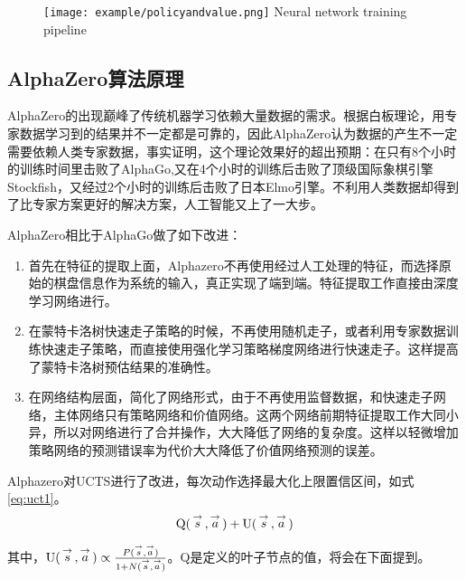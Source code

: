 \begin{figure}[htbp]
	\centering
	\texttt{[image: example/policyandvalue.png]}
	{Neural network training pipeline}
	\label{fig:policyandvalue}
\end{figure}

\subsection{AlphaZero算法原理}

AlphaZero的出现巅峰了传统机器学习依赖大量数据的需求。根据白板理论，用专家数据学习到的结果并不一定都是可靠的，因此AlphaZero认为数据的产生不一定需要依赖人类专家数据，事实证明，这个理论效果好的超出预期：在只有8个小时的训练时间里击败了AlphaGo,又在4个小时的训练后击败了顶级国际象棋引擎Stockfish，又经过2个小时的训练后击败了日本Elmo引擎。不利用人类数据却得到了比专家方案更好的解决方案，人工智能又上了一大步。

AlphaZero相比于AlphaGo做了如下改进：
\begin{enumerate}
	\item 首先在特征的提取上面，Alphazero不再使用经过人工处理的特征，而选择原始的棋盘信息作为系统的输入，真正实现了端到端。特征提取工作直接由深度学习网络进行。
	\item 在蒙特卡洛树快速走子策略的时候，不再使用随机走子，或者利用专家数据训练快速走子策略，而直接使用强化学习策略梯度网络进行快速走子。这样提高了蒙特卡洛树预估结果的准确性。
	\item 在网络结构层面，简化了网络形式，由于不再使用监督数据，和快速走子网络，主体网络只有策略网络和价值网络。这两个网络前期特征提取工作大同小异，所以对网络进行了合并操作，大大降低了网络的复杂度。这样以轻微增加策略网络的预测错误率为代价大大降低了价值网络预测的误差。
\end{enumerate}

Alphazero对UCTS进行了改进，每次动作选择最大化上限置信区间，如式\ref{eq:uct1}。
\begin{equation}
\label{eq:uct1}
{\rm{Q(}}\mathop s\limits^ \to  {\rm{,}}\mathop a\limits^ \to  {\rm{) + U(}}\mathop s\limits^ \to  {\rm{,}}\mathop a\limits^ \to  {\rm{)}}
\end{equation}

其中，${\rm{U(}}\mathop s\limits^ \to  {\rm{,}}\mathop a\limits^ \to  {\rm{)}} \propto \frac{{P(\mathop s\limits^ \to  ,\mathop a\limits^ \to  )}}{{1 + N(\mathop s\limits^ \to  ,\mathop a\limits^ \to  )}}$。Q是定义的叶子节点的值，将会在下面提到。

